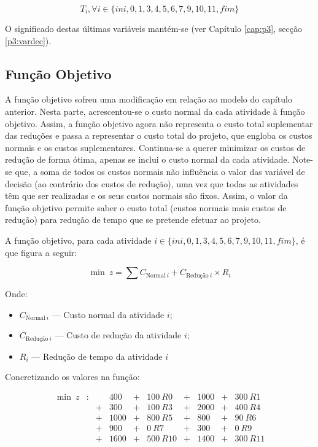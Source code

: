 $$T_i, \forall i \in \{ini, 0, 1, 3, 4,5,6,7,9,10,11,fim\}$$

O significado destas últimas variáveis mantém-se (ver Capítulo \ref{cap:p3}, secção \ref{p3:vardec}).


\subsection{Função Objetivo}
 
A função objetivo sofreu uma modificação em relação ao modelo do capítulo
anterior. Nesta parte, acrescentou-se o custo normal da cada atividade à função objetivo. Assim, a função objetivo agora não representa o custo total suplementar das reduções e passa a representar o custo total do projeto, que engloba os custos normais e os custos suplementares. Continua-se a querer minimizar os custos de redução de forma ótima, apenas se
inclui o custo normal da cada atividade. Note-se que, a soma de todos os custos
normais não influência o valor das variável de decisão (ao contrário dos
custos de redução), uma vez que todas as atividades têm que ser realizadas e os seus custos normais são fixos.
Assim, o valor da função objetivo permite saber o custo total (custos normais
mais custos de redução) para redução de tempo que se pretende efetuar ao projeto.


A função objetivo, para cada atividade $i \in \{ini, 0, 1, 3,
4,5,6,7,9,10,11,fim\}$, é que figura a seguir:

\begin{displaymath} 	
	\min~z = \sum C_{\text{Normal}~i} + C_{\text{Redução}~i} \times R_{i}
\end{displaymath}

Onde:

\begin{itemize} 
	
	\item $C_{\text{Normal}~i}$ --- Custo normal da atividade $i$;

	\item $C_{\text{Redução}~i}$ --- Custo de redução da atividade $i$;
	\item $R_{i}$ --- Redução de tempo da atividade $i$ 

\end{itemize}

Concretizando os valores na função:

\begin{align*}
	\min~z&:&   &400 & +& 100~R0 & +& 1000& +& 300~R1 \\
	      & & + &300 & +& 100~R3 & +& 2000& +& 400~R4 \\
		  & & + &1000& +& 800~R5 & +&  800& +&  90~R6 \\ 
		  & & + &900 & +& 0~R7 & +&  300& +&   0~R9 \\
		  & & + &1600& +& 500~R10& +& 1400& +& 300~R11 \\
\end{align*}

